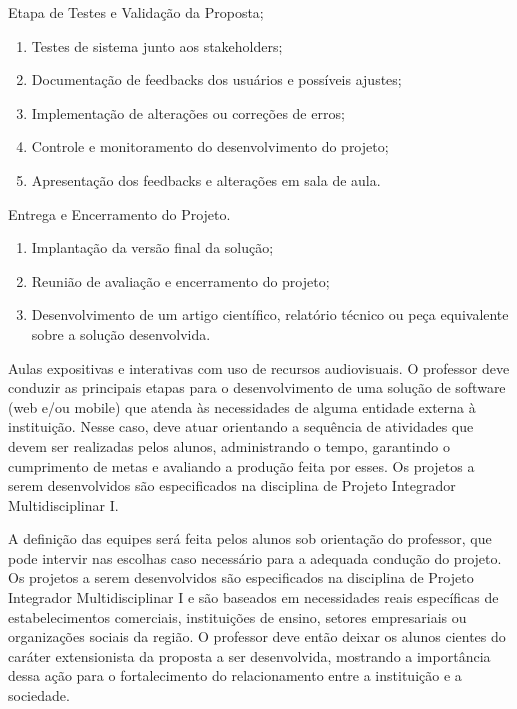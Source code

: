 \begin{pud}
\begin{description}[itemsep=0em]
		\item[UNIDADE III:] Etapa de Testes e Validação da Proposta; 
 	    \begin{enumerate}[itemsep=0em, topsep=0em]
 			\item Testes de sistema junto aos stakeholders;
 			\item Documentação de feedbacks dos usuários e possíveis ajustes;
 			\item Implementação de alterações ou correções de erros;
 			\item Controle e monitoramento do desenvolvimento do projeto;
 			\item Apresentação dos feedbacks e alterações em sala de aula.
		\end{enumerate}
		
		\item[UNIDADE IV:] Entrega e Encerramento do Projeto. 
 	    \begin{enumerate}[itemsep=0em, topsep=0em]
 			\item Implantação da versão final da solução;
 			\item Reunião de avaliação e encerramento do projeto;
 			\item Desenvolvimento de um artigo científico, relatório técnico ou peça
equivalente sobre a solução desenvolvida.
		\end{enumerate}
		
		
	\end{description}
	
	\metodologia
	Aulas expositivas e interativas com uso de recursos audiovisuais. O professor deve
	conduzir as principais etapas para o desenvolvimento de uma solução de software
	(web e/ou mobile) que atenda às necessidades de alguma entidade externa à
	instituição. Nesse caso, deve atuar orientando a sequência de atividades que devem
	ser realizadas pelos alunos, administrando o tempo, garantindo o cumprimento de
	metas e avaliando a produção feita por esses. Os projetos a serem desenvolvidos
	são especificados na disciplina de Projeto Integrador Multidisciplinar I.
	
	A definição das equipes será feita pelos alunos sob orientação do professor, que
	pode intervir nas escolhas caso necessário para a adequada condução do projeto.
	Os projetos a serem desenvolvidos são especificados na disciplina de Projeto
	Integrador Multidisciplinar I e são baseados em necessidades reais específicas de
	estabelecimentos comerciais, instituições de ensino, setores empresariais ou
	organizações sociais da região. O professor deve então deixar os alunos cientes do
	caráter extensionista da proposta a ser desenvolvida, mostrando a importância
	dessa ação para o fortalecimento do relacionamento entre a instituição e a
	sociedade.
	

\end{pud}
